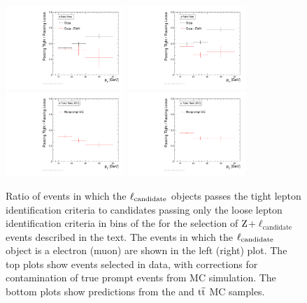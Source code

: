 \begin{figure}[htbp]
  \centering
   \includegraphics[width=0.4\textwidth]{figures/AnalysisProcedure/ratio1DPt_allE.pdf}
   \includegraphics[width=0.4\textwidth]{figures/AnalysisProcedure/ratio1DPt_allMu.pdf}
   \includegraphics[width=0.4\textwidth]{figures/AnalysisProcedure/ratio1DPt_allE_MC.pdf}
   \includegraphics[width=0.4\textwidth]{figures/AnalysisProcedure/ratio1DPt_allMu_MC.pdf}
  \caption{
    Ratio of events in which the $\ell_{\rm candidate}$ objects passes the tight lepton 
    identification criteria to candidates passing only the loose lepton identification 
    criteria in bins of the {\lcand} \PT for the selection of $\mathrm{Z}$+$\ell_{\mathrm{candidate}}$ 
    events described in the text.
    The events in which the $\ell_{\rm candidate}$ object is a electron (muon) are shown in 
    the left (right) plot. The top plots show events selected in data, with
    corrections for contamination of true prompt events from MC simulation. The bottom plots
    show predictions from the {\Zpj} and ${\mathrm{t}\overline{\mathrm{t}}}$ MC samples.
          }
 \label{fig:fakeRates1DPt}
\end{figure}

